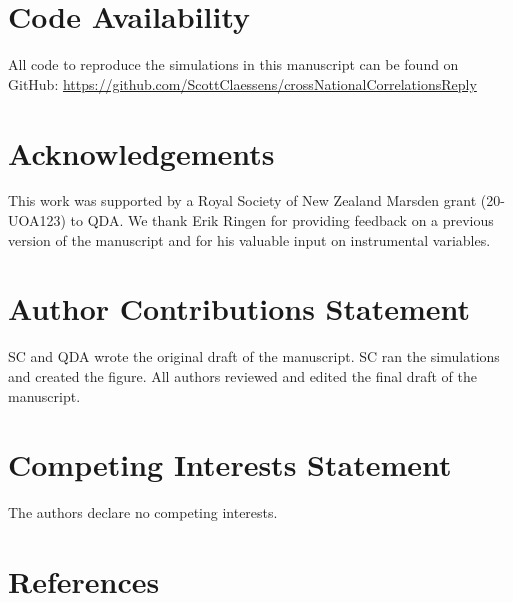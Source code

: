 \documentclass[
  man, donotrepeattitle,floatsintext]{apa6}
\begin{document}
\hypertarget{code-availability}{%
\section{Code Availability}\label{code-availability}}

All code to reproduce the simulations in this manuscript can be found on
GitHub: \url{https://github.com/ScottClaessens/crossNationalCorrelationsReply}

\hypertarget{acknowledgements}{%
\section{Acknowledgements}\label{acknowledgements}}

This work was supported by a Royal Society of New Zealand Marsden grant
(20-UOA123) to QDA. We thank Erik Ringen for providing feedback on a previous
version of the manuscript and for his valuable input on instrumental variables.

\hypertarget{author-contributions-statement}{%
\section{Author Contributions Statement}\label{author-contributions-statement}}

SC and QDA wrote the original draft of the manuscript. SC ran the simulations
and created the figure. All authors reviewed and edited the final draft of the
manuscript.

\hypertarget{competing-interests-statement}{%
\section{Competing Interests Statement}\label{competing-interests-statement}}

The authors declare no competing interests.

\newpage

\hypertarget{references}{%
\section{References}\label{references}}

\begingroup
\end{document}
